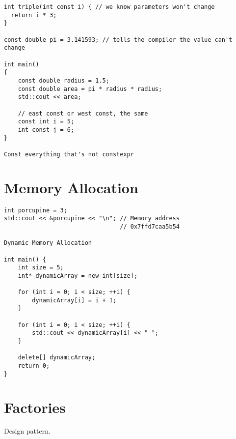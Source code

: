 \documentclass[openany]{report}
\begin{document}
\begin{verbatim}
int triple(int const i) { // we know parameters won't change
  return i * 3;
}

const double pi = 3.141593; // tells the compiler the value can't change

int main()
{
    const double radius = 1.5;
    const double area = pi * radius * radius;
    std::cout << area;

    // east const or west const, the same
    const int i = 5;
    int const j = 6;
}

Const everything that's not constexpr
\end{verbatim}


\section{Memory Allocation}

\begin{verbatim}
int porcupine = 3;
std::cout << &porcupine << "\n"; // Memory address
                                 // 0x7ffd7caa5b54

Dynamic Memory Allocation

int main() {
    int size = 5;
    int* dynamicArray = new int[size];

    for (int i = 0; i < size; ++i) {
        dynamicArray[i] = i + 1;
    }

    for (int i = 0; i < size; ++i) {
        std::cout << dynamicArray[i] << " ";
    }

    delete[] dynamicArray;
    return 0;
}
\end{verbatim}

\section{Factories}

Design pattern.
\end{document}
